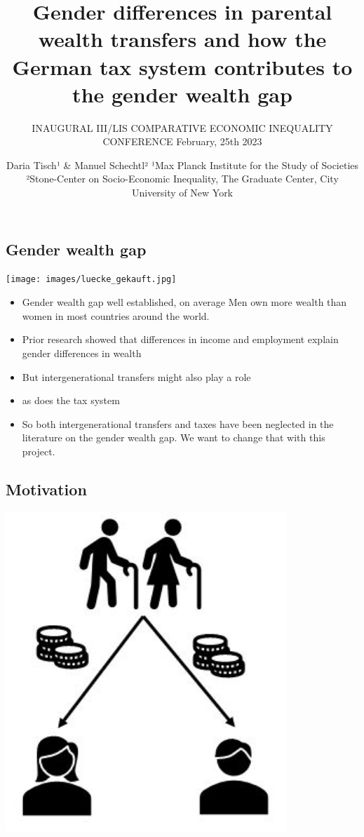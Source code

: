 \documentclass[
  letterpaper,
  DIV=11,
  numbers=noendperiod]{scrartcl}
\title{Gender differences in parental wealth transfers and how the
German tax system contributes to the gender wealth gap}
\subtitle{INAUGURAL III/LIS COMPARATIVE ECONOMIC INEQUALITY CONFERENCE
February, 25th 2023}
\author{ Daria Tisch¹ \& Manuel Schechtl² ¹Max Planck Institute for the
Study of Societies ²Stone-Center on Socio-Economic Inequality, The
Graduate Center, City University of New York}
\date{}
\providecommand{\tightlist}{%
  \setlength{\itemsep}{0pt}\setlength{\parskip}{0pt}}\usepackage{longtable,booktabs,array}
\begin{document}
\maketitle
\ifdefined\Shaded\renewenvironment{Shaded}{\begin{tcolorbox}[interior hidden, frame hidden, sharp corners, borderline west={3pt}{0pt}{shadecolor}, boxrule=0pt, enhanced, breakable]}{\end{tcolorbox}}\fi

\hypertarget{gender-wealth-gap}{%
\subsection{Gender wealth gap}\label{gender-wealth-gap}}

\texttt{[image: images/luecke\_gekauft.jpg]}

\begin{itemize}
\tightlist
\item
  Gender wealth gap well established, on average Men own more wealth
  than women in most countries around the world.
\item
  Prior research showed that differences in income and employment
  explain gender differences in wealth
\item
  But intergenerational transfers might also play a role
\item
  as does the tax system
\item
  So both intergenerational transfers and taxes have been neglected in
  the literature on the gender wealth gap. We want to change that with
  this project.
\end{itemize}

\hypertarget{motivation}{%
\subsection{Motivation}\label{motivation}}

\includegraphics[width=4.16667in,height=\textheight]{images/transfers.jpg}
\end{document}
